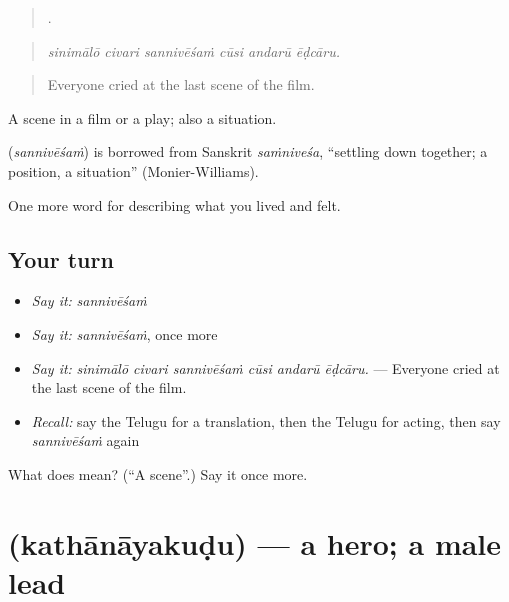 \begin{quote}
     .
\end{quote}

\begin{quote}
\emph{sinimālō civari sannivēśaṁ cūsi andarū ēḍcāru.}
\end{quote}

\begin{quote}
Everyone cried at the last scene of the film.
\end{quote}

A scene in a film or a play; also a situation.

\begin{cousinweb}
\textbf{} (\emph{sannivēśaṁ}) is borrowed from Sanskrit \emph{saṁniveśa}, \textquotedblleft{}settling down together; a position, a situation\textquotedblright{} (Monier-Williams).
\end{cousinweb}

\begin{grammarlens}[title={What you've built}]
One more word for describing what you lived and felt.
\end{grammarlens}

\subsection*{Your turn}
\begin{itemize}
\raggedright
  \item \emph{Say it:} \emph{sannivēśaṁ}
  \item \emph{Say it:} \emph{sannivēśaṁ}, once more
  \item \emph{Say it:} \emph{sinimālō civari sannivēśaṁ cūsi andarū ēḍcāru.} — Everyone cried at the last scene of the film.
  \item \emph{Recall:} say the Telugu for a translation, then the Telugu for acting, then say \emph{sannivēśaṁ} again
\end{itemize}

\begin{tcolorbox}[breakable,colback=teal!4,colframe=teal!35!black,title={Before you move on}]
What does  mean? (\textquotedblleft{}A scene\textquotedblright{}.) Say it once more.
\end{tcolorbox}
\section[\texorpdfstring{\te{కథానాయకుడు} (kathānāyakuḍu)}{కథానాయకుడు (kathānāyakuḍu)}]{ (kathānāyakuḍu) — a hero; a male lead}

